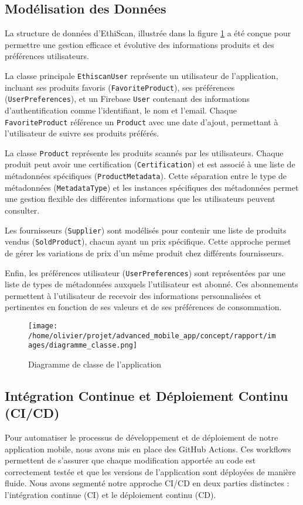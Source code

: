 \subsection{Modélisation des Données}
\label{sec:data_model}

La structure de données d'EthiScan, illustrée dans la figure \ref{fig:diagramme_classe} a été conçue pour permettre une gestion efficace et évolutive des informations produits et des préférences utilisateurs.

La classe principale \texttt{EthiscanUser} représente un utilisateur de l'application, incluant ses produits favoris (\texttt{FavoriteProduct}), ses préférences (\texttt{UserPreferences}), et un Firebase \texttt{User} contenant des informations d'authentification comme l'identifiant, le nom et l'email. Chaque \texttt{FavoriteProduct} référence un \texttt{Product} avec une date d'ajout, permettant à l'utilisateur de suivre ses produits préférés.

La classe \texttt{Product} représente les produits scannés par les utilisateurs. Chaque produit peut avoir une certification (\texttt{Certification}) et est associé à une liste de métadonnées spécifiques (\texttt{ProductMetadata}). Cette séparation entre le type de métadonnées (\texttt{MetadataType}) et les instances spécifiques des métadonnées permet une gestion flexible des différentes informations que les utilisateurs peuvent consulter.

Les fournisseurs (\texttt{Supplier}) sont modélisés pour contenir une liste de produits vendus (\texttt{SoldProduct}), chacun ayant un prix spécifique. Cette approche permet de gérer les variations de prix d'un même produit chez différents fournisseurs.

Enfin, les préférences utilisateur (\texttt{UserPreferences}) sont représentées par une liste de types de métadonnées auxquels l'utilisateur est abonné. Ces abonnements permettent à l'utilisateur de recevoir des informations personnalisées et pertinentes en fonction de ses valeurs et de ses préférences de consommation.

\begin{figure}[h]
    \centering
    \texttt{[image: /home/olivier/projet/advanced\_mobile\_app/concept/rapport/images/diagramme\_classe.png]}
    \caption{Diagramme de classe de l'application}
    \label{fig:diagramme_classe}
\end{figure}

\subsection{Intégration Continue et Déploiement Continu (CI/CD)}
\label{sec:ci_cd}
Pour automatiser le processus de développement et de déploiement de notre application mobile, nous avons mis en place des GitHub Actions. Ces workflows permettent de s'assurer que chaque modification apportée au code est correctement testée et que les versions de l'application sont déployées de manière fluide. Nous avons segmenté notre approche CI/CD en deux parties distinctes : l'intégration continue (CI) et le déploiement continu (CD).

